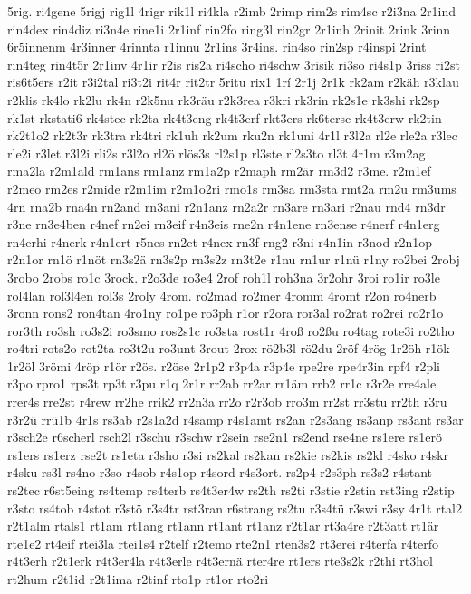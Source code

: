 {5rig.
ri4gene
5rigj
rig1l
4rigr
rik1l
ri4kla
r2imb
2rimp
rim2s
rim4sc
r2i3na
2r1ind
rin4dex
rin4diz
ri3n4e
rine1i
2r1inf
rin2fo
ring3l
rin2gr
2r1inh
2rinit
2rink
3rinn
6r5innenm
4r3inner
4rinnta
r1innu
2r1ins
3r4ins.
rin4so
rin2sp
r4inspi
2rint
rin4teg
rin4t5r
2r1inv
4r1ir
r2is
ris2a
ri4scho
ri4schw
3risik
ri3so
ri4s1p
3riss
ri2st
ris6t5ers
r2it
r3i2tal
ri3t2i
rit4r
rit2tr
5ritu
rix1
1rí
2r1j
2r1k
rk2am
r2käh
r3klau
r2klis
rk4lo
rk2lu
rk4n
r2k5nu
rk3räu
r2k3rea
r3kri
rk3rin
rk2s1e
rk3shi
rk2sp
rk1st
rkstati6
rk4stec
rk2ta
rk4t3eng
rk4t3erf
rkt3ers
rk6tersc
rk4t3erw
rk2tin
rk2t1o2
rk2t3r
rk3tra
rk4tri
rk1uh
rk2um
rku2n
rk1uni
4r1l
r3l2a
rl2e
rle2a
r3lec
rle2i
r3let
r3l2i
rli2s
r3l2o
rl2ö
rlös3s
rl2s1p
rl3ste
rl2s3to
rl3t
4r1m
r3m2ag
rma2la
r2m1ald
rm1ans
rm1anz
rm1a2p
r2maph
rm2är
rm3d2
r3me.
r2m1ef
r2meo
rm2es
r2mide
r2m1im
r2m1o2ri
rmo1s
rm3sa
rm3sta
rmt2a
rm2u
rm3ums
4rn
rna2b
rna4n
rn2and
rn3ani
r2n1anz
rn2a2r
rn3are
rn3ari
r2nau
rnd4
rn3dr
r3ne
rn3e4ben
r4nef
rn2ei
rn3eif
r4n3eis
rne2n
r4n1ene
rn3ense
r4nerf
r4n1erg
rn4erhi
r4nerk
r4n1ert
r5nes
rn2et
r4nex
rn3f
rng2
r3ni
r4n1in
r3nod
r2n1op
r2n1or
rn1ö
r1nöt
rn3s2ä
rn3s2p
rn3s2z
rn3t2e
r1nu
rn1ur
r1nü
r1ny
ro2bei
2robj
3robo
2robs
ro1c
3rock.
r2o3de
ro3e4
2rof
roh1l
roh3na
3r2ohr
3roi
ro1ir
ro3le
rol4lan
rol3l4en
rol3s
2roly
4rom.
ro2mad
ro2mer
4romm
4romt
r2on
ro4nerb
3ronn
rons2
ron4tan
4ro1ny
ro1pe
ro3ph
r1or
r2ora
ror3al
ro2rat
ro2rei
ro2r1o
ror3th
ro3sh
ro3s2i
ro3smo
ros2s1c
ro3sta
rost1r
4roß
ro2ßu
ro4tag
rote3i
ro2tho
ro4tri
rots2o
rot2ta
ro3t2u
ro3unt
3rout
2rox
rö2b3l
rö2du
2röf
4rög
1r2öh
r1ök
1r2öl
3römi
4röp
r1ör
r2ös.
r2öse
2r1p2
r3p4a
r3p4e
rpe2re
rpe4r3in
rpf4
r2pli
r3po
rpro1
rps3t
rp3t
r3pu
r1q
2r1r
rr2ab
rr2ar
rr1äm
rrb2
rr1c
r3r2e
rre4ale
rrer4s
rre2st
r4rew
rr2he
rrik2
rr2n3a
rr2o
r2r3ob
rro3m
rr2st
rr3stu
rr2th
r3ru
r3r2ü
rrü1b
4r1s
rs3ab
r2s1a2d
r4samp
r4s1amt
rs2an
r2s3ang
rs3anp
rs3ant
rs3ar
r3sch2e
r6scherl
rsch2l
r3schu
r3schw
r2sein
rse2n1
rs2end
rse4ne
rs1ere
rs1erö
rs1ers
rs1erz
rse2t
rs1eta
r3sho
r3si
rs2kal
rs2kan
rs2kie
rs2kis
rs2kl
r4sko
r4skr
r4sku
rs3l
rs4no
r3so
r4sob
r4s1op
r4sord
r4s3ort.
rs2p4
r2s3ph
rs3s2
r4stant
rs2tec
r6st5eing
rs4temp
rs4terb
rs4t3er4w
rs2th
rs2ti
r3stie
r2stin
rst3ing
r2stip
r3sto
rs4tob
r4stot
r3stö
r3s4tr
rst3ran
r6strang
rs2tu
r3s4tü
r3swi
r3sy
4r1t
rtal2
r2t1alm
rtals1
rt1am
rt1ang
rt1ann
rt1ant
rt1anz
r2t1ar
rt3a4re
r2t3att
rt1är
rte1e2
rt4eif
rtei3la
rtei1s4
r2telf
r2temo
rte2n1
rten3s2
rt3erei
r4terfa
r4terfo
r4t3erh
r2t1erk
r4t3er4la
r4t3erle
r4t3ernä
rter4re
rt1ers
rte3s2k
r2thi
rt3hol
rt2hum
r2t1id
r2t1ima
r2tinf
rto1p
rt1or
rto2ri
}
